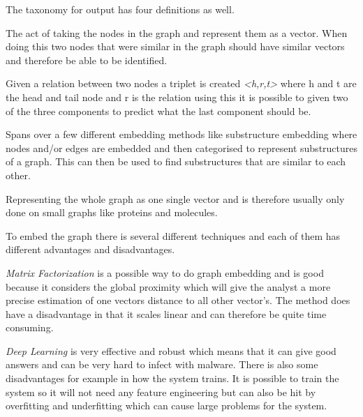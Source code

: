 The taxonomy for output has four definitions as well.

\begin{definition} The act of taking the nodes in the graph and represent them as a vector. When doing this two nodes that were similar in the graph should have similar vectors and therefore be able to be identified\cite{8294302}.
\end{definition}

\begin{definition} Given a relation between two nodes a triplet is created \textit{<h,r,t>}  where h and t are the head and tail node and r is the relation using this it is possible to given two of the three components to predict what the last component should be\cite{8294302}.
\end{definition}

\begin{definition} Spans over a few different embedding methods like substructure embedding where nodes and/or edges are embedded and then categorised to represent substructures of a graph. This can then be used to find substructures that are similar to each other\cite{8294302}.
\end{definition}

\begin{definition} Representing the whole graph as one single vector and is therefore usually only done on small graphs like proteins and molecules\cite{8294302}. 
\end{definition}

To embed the graph there is several different techniques and each of them has different advantages and disadvantages.

\textit{Matrix Factorization} is a possible way to do graph embedding and is good because it considers the global proximity which will give the analyst a more precise estimation of one vectors distance to all other vector's. The method does have a disadvantage in that it scales linear and can therefore be quite time consuming\cite{8294302}.

\textit{Deep Learning} is very effective and robust which means that it can give good answers and can be very hard to infect with malware. There is also some disadvantages for example in how the system trains. It is possible to train the system so it will not need any feature engineering but can also be hit by overfitting and underfitting which can cause large problems for the system\cite{8294302}.

